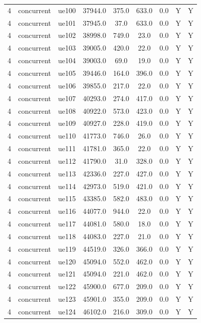 \begin{table}[ht]
\begin{tabular}{|c|c|c|c|c|c|c|c|c|}
4 & concurrent & ue100 & 37944.0 & 375.0 & 633.0 & 0.0 & Y & Y \\
4 & concurrent & ue101 & 37945.0 & 37.0 & 633.0 & 0.0 & Y & Y \\
4 & concurrent & ue102 & 38998.0 & 749.0 & 23.0 & 0.0 & Y & Y \\
4 & concurrent & ue103 & 39005.0 & 420.0 & 22.0 & 0.0 & Y & Y \\
4 & concurrent & ue104 & 39003.0 & 69.0 & 19.0 & 0.0 & Y & Y \\
4 & concurrent & ue105 & 39446.0 & 164.0 & 396.0 & 0.0 & Y & Y \\
4 & concurrent & ue106 & 39855.0 & 217.0 & 22.0 & 0.0 & Y & Y \\
4 & concurrent & ue107 & 40293.0 & 274.0 & 417.0 & 0.0 & Y & Y \\
4 & concurrent & ue108 & 40922.0 & 573.0 & 423.0 & 0.0 & Y & Y \\
4 & concurrent & ue109 & 40927.0 & 228.0 & 419.0 & 0.0 & Y & Y \\
4 & concurrent & ue110 & 41773.0 & 746.0 & 26.0 & 0.0 & Y & Y \\
4 & concurrent & ue111 & 41781.0 & 365.0 & 22.0 & 0.0 & Y & Y \\
4 & concurrent & ue112 & 41790.0 & 31.0 & 328.0 & 0.0 & Y & Y \\
4 & concurrent & ue113 & 42336.0 & 227.0 & 427.0 & 0.0 & Y & Y \\
4 & concurrent & ue114 & 42973.0 & 519.0 & 421.0 & 0.0 & Y & Y \\
4 & concurrent & ue115 & 43385.0 & 582.0 & 483.0 & 0.0 & Y & Y \\
4 & concurrent & ue116 & 44077.0 & 944.0 & 22.0 & 0.0 & Y & Y \\
4 & concurrent & ue117 & 44081.0 & 580.0 & 18.0 & 0.0 & Y & Y \\
4 & concurrent & ue118 & 44083.0 & 227.0 & 21.0 & 0.0 & Y & Y \\
4 & concurrent & ue119 & 44519.0 & 326.0 & 366.0 & 0.0 & Y & Y \\
4 & concurrent & ue120 & 45094.0 & 552.0 & 462.0 & 0.0 & Y & Y \\
4 & concurrent & ue121 & 45094.0 & 221.0 & 462.0 & 0.0 & Y & Y \\
4 & concurrent & ue122 & 45900.0 & 677.0 & 209.0 & 0.0 & Y & Y \\
4 & concurrent & ue123 & 45901.0 & 355.0 & 209.0 & 0.0 & Y & Y \\
4 & concurrent & ue124 & 46102.0 & 216.0 & 309.0 & 0.0 & Y & Y \\

\end{tabular}
\end{table}
